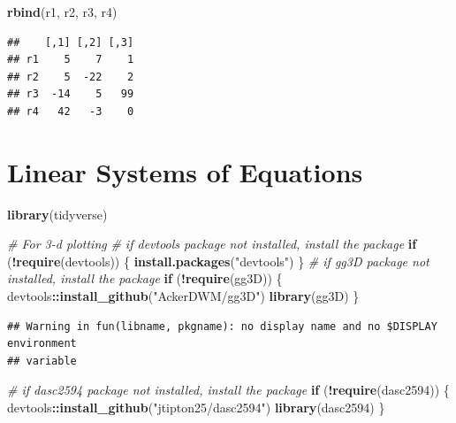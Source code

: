 \documentclass[
]{book}
\newenvironment{Shaded}{\begin{snugshade}}{\end{snugshade}}
\newcommand{\CommentTok}[1]{\textcolor[rgb]{0.56,0.35,0.01}{\textit{#1}}}
\newcommand{\ControlFlowTok}[1]{\textcolor[rgb]{0.13,0.29,0.53}{\textbf{#1}}}
\newcommand{\KeywordTok}[1]{\textcolor[rgb]{0.13,0.29,0.53}{\textbf{#1}}}
\newcommand{\NormalTok}[1]{#1}
\newcommand{\OperatorTok}[1]{\textcolor[rgb]{0.81,0.36,0.00}{\textbf{#1}}}
\newcommand{\StringTok}[1]{\textcolor[rgb]{0.31,0.60,0.02}{#1}}
\theoremstyle{definition}
\theoremstyle{definition}
\theoremstyle{definition}
\theoremstyle{remark}
\begin{document}
\begin{Shaded}
\begin{Highlighting}[]
\KeywordTok{rbind}\NormalTok{(r1, r2, r3, r4)}
\end{Highlighting}
\end{Shaded}

\begin{verbatim}
##    [,1] [,2] [,3]
## r1    5    7    1
## r2    5  -22    2
## r3  -14    5   99
## r4   42   -3    0
\end{verbatim}

\hypertarget{linear-systems-of-equations}{%
\chapter{Linear Systems of Equations}\label{linear-systems-of-equations}}

\begin{Shaded}
\begin{Highlighting}[]
\KeywordTok{library}\NormalTok{(tidyverse)}

\CommentTok{# For 3-d plotting}
\CommentTok{# if devtools package not installed, install the package}
\ControlFlowTok{if}\NormalTok{ (}\OperatorTok{!}\KeywordTok{require}\NormalTok{(devtools)) \{}
    \KeywordTok{install.packages}\NormalTok{(}\StringTok{"devtools"}\NormalTok{)}
\NormalTok{\}}
\CommentTok{# if gg3D package not installed, install the package}
\ControlFlowTok{if}\NormalTok{ (}\OperatorTok{!}\KeywordTok{require}\NormalTok{(gg3D)) \{}
\NormalTok{    devtools}\OperatorTok{::}\KeywordTok{install_github}\NormalTok{(}\StringTok{"AckerDWM/gg3D"}\NormalTok{)}
    \KeywordTok{library}\NormalTok{(gg3D)}
\NormalTok{\}}
\end{Highlighting}
\end{Shaded}

\begin{verbatim}
## Warning in fun(libname, pkgname): no display name and no $DISPLAY environment
## variable
\end{verbatim}

\begin{Shaded}
\begin{Highlighting}[]
\CommentTok{# if dasc2594 package not installed, install the package}
\ControlFlowTok{if}\NormalTok{ (}\OperatorTok{!}\KeywordTok{require}\NormalTok{(dasc2594)) \{}
\NormalTok{    devtools}\OperatorTok{::}\KeywordTok{install_github}\NormalTok{(}\StringTok{"jtipton25/dasc2594"}\NormalTok{)}
    \KeywordTok{library}\NormalTok{(dasc2594)}
\NormalTok{\}}
\end{Highlighting}
\end{Shaded}
\end{document}
